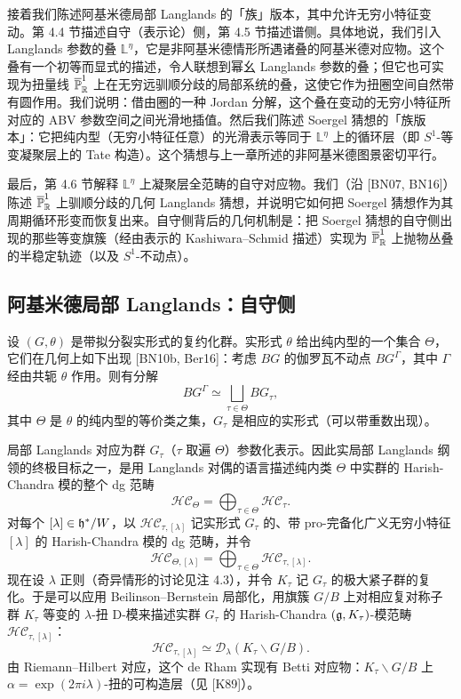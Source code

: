 
接着我们陈述阿基米德局部 Langlands 的「族」版本，其中允许无穷小特征变动。第 4.4 节描述自守（表示论）侧，第 4.5 节描述谱侧。具体地说，我们引入 Langlands 参数的叠 $\mathbb L^\eta$，它是非阿基米德情形所遇诸叠的阿基米德对应物。这个叠有一个初等而显式的描述，令人联想到幂幺 Langlands 参数的叠；但它也可实现为扭量线 $\overline{\mathbb{P}}^1_{\mathbb{R}}$ 上在无穷远驯顺分歧的局部系统的叠，这使它作为扭圈空间自然带有圆作用。我们说明：借由圈的一种 Jordan 分解，这个叠在变动的无穷小特征所对应的 ABV 参数空间之间光滑地插值。然后我们陈述 Soergel 猜想的「族版本」：它把纯内型（无穷小特征任意）的光滑表示等同于 $\mathbb L^\eta$ 上的循环层（即 $S^1$-等变凝聚层上的 Tate 构造）。这个猜想与上一章所述的非阿基米德图景密切平行。

最后，第 4.6 节解释 $\mathbb L^\eta$ 上凝聚层全范畴的自守对应物。我们（沿 [BN07, BN16]）陈述 $\overline{\mathbb{P}}^1_{\mathbb{R}}$ 上驯顺分歧的几何 Langlands 猜想，并说明它如何把 Soergel 猜想作为其周期循环形变而恢复出来。自守侧背后的几何机制是：把 Soergel 猜想的自守侧出现的那些等变旗簇（经由表示的 Kashiwara--Schmid 描述）实现为 $\overline{\mathbb{P}}^1_{\mathbb{R}}$ 上抛物丛叠的半稳定轨迹（以及 $S^1$-不动点）。

\subsection{阿基米德局部 Langlands：自守侧}

设 $(G,\theta)$ 是带拟分裂实形式的复约化群。实形式 $\theta$ 给出纯内型的一个集合 $\Theta$，它们在几何上如下出现 [BN10b, Ber16]：考虑 $BG$ 的伽罗瓦不动点 $BG^\Gamma$，其中 $\Gamma$ 经由共轭 $\theta$ 作用。则有分解
\[
BG^\Gamma\simeq\bigsqcup_{\tau\in\Theta}BG_\tau,
\]
其中 $\Theta$ 是 $\theta$ 的纯内型的等价类之集，$G_\tau$ 是相应的实形式（可以带重数出现）。

局部 Langlands 对应为群 $G_\tau$（$\tau$ 取遍 $\Theta$）参数化表示。因此实局部 Langlands 纲领的终极目标之一，是用 Langlands 对偶的语言描述纯内类 $\Theta$ 中实群的 Harish-Chandra 模的整个 dg 范畴
\[
\mathcal{HC}_\Theta=\bigoplus_{\tau\in\Theta}\mathcal{HC}_\tau.
\]
对每个 $[\lambda]\in\mathfrak{h}^*/W$，以 $\mathcal{HC}_{\tau,[\lambda]}$ 记实形式 $G_\tau$ 的、带 pro-完备化广义无穷小特征 $[\lambda]$ 的 Harish-Chandra 模的 dg 范畴，并令
\[
\mathcal{HC}_{\Theta,[\lambda]}=\bigoplus_{\tau\in\Theta}\mathcal{HC}_{\tau,[\lambda]}.
\]
现在设 $\lambda$ 正则（奇异情形的讨论见注 4.3），并令 $K_\tau$ 记 $G_\tau$ 的极大紧子群的复化。于是可以应用 Beilinson--Bernstein 局部化，用旗簇 $G/B$ 上对相应复对称子群 $K_\tau$ 等变的 $\lambda$-扭 D-模来描述实群 $G_\tau$ 的 Harish-Chandra $(\mathfrak{g},K_\tau)$-模范畴 $\mathcal{HC}_{\tau,[\lambda]}$：
\[
\mathcal{HC}_{\tau,[\lambda]}\simeq \mathcal D_\lambda(K_\tau\backslash G/B).
\]
由 Riemann--Hilbert 对应，这个 de Rham 实现有 Betti 对应物：$K_\tau\backslash G/B$ 上 $\alpha=\exp(2\pi i\lambda)$-扭的可构造层（见 [K89]）。

